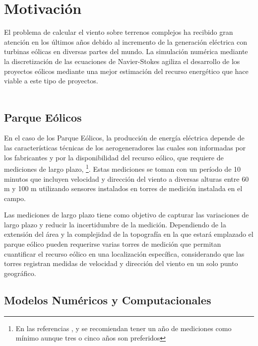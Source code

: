 \section{Motivación}

El problema de calcular el viento sobre terrenos complejos ha recibido gran atención en los últimos años debido al incremento de la generación eléctrica con turbinas eólicas en diversas partes del mundo. La simulación numérica mediante la discretización de las ecuaciones de Navier-Stokes agiliza el desarrollo de los proyectos eólicos mediante una mejor estimación del recurso energético que hace viable a este tipo de proyectos.
\\
\\\subsection{Parque Eólicos}
En el caso de los Parque Eólicos, la producción de energía eléctrica depende de las características técnicas de los aerogeneradores las cuales son informadas por los fabricantes y por la disponibilidad del recurso eólico, que requiere de mediciones de largo plazo, \footnote{En las referencias  \citep{wbank_guidelines_2014}, \citep{sanz_state---art_2010} y \citep{bailey_wind_1997} se recomiendan tener un año de mediciones como mínimo aunque tres o cinco años son preferidos}. Estas mediciones se toman con un período de 10 minutos que incluyen velocidad y dirección del viento a diversas alturas entre 60 m y 100 m utilizando  sensores instalados en torres de medición instalada en el campo. 

Las mediciones de largo plazo tiene como objetivo de capturar las variaciones de largo plazo y reducir la incertidumbre de la medición. Dependiendo de la extensión del área y la complejidad de la topografía en la que estará emplazado el parque eólico pueden requerirse varias torres de medición que permitan cuantificar el recurso eólico en una localización específica, considerando que las torres registran medidas de velocidad y dirección del viento en un solo punto geográfico.

\subsection{Modelos Numéricos y Computacionales}

